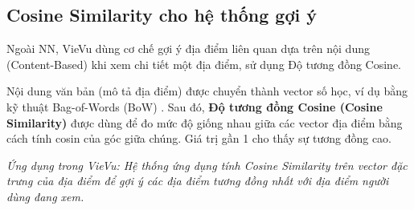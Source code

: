 \subsection{Cosine Similarity cho hệ thống gợi ý}

Ngoài NN, VieVu dùng cơ chế gợi ý địa điểm liên quan dựa trên nội dung (Content-Based) khi xem chi tiết một địa điểm, sử dụng Độ tương đồng Cosine.

Nội dung văn bản (mô tả địa điểm) được chuyển thành vector số học, ví dụ bằng kỹ thuật Bag-of-Words (BoW) \cite{bow_concept}. Sau đó, \textbf{Độ tương đồng Cosine (Cosine Similarity)} \cite{cosine_similarity_concept} được dùng để đo mức độ giống nhau giữa các vector địa điểm bằng cách tính cosin của góc giữa chúng. Giá trị gần 1 cho thấy sự tương đồng cao.

\textit{Ứng dụng trong VieVu: Hệ thống ứng dụng tính Cosine Similarity trên vector đặc trưng của địa điểm để gợi ý các địa điểm tương đồng nhất với địa điểm người dùng đang xem.}